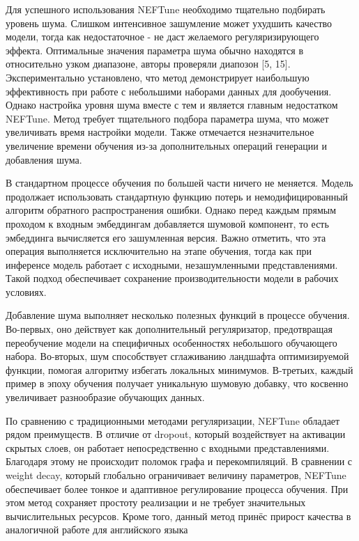 Для успешного использования NEFTune необходимо тщательно подбирать уровень шума.
Слишком интенсивное зашумление может ухудшить качество модели, тогда как недостаточное - не даст желаемого регуляризирующего эффекта.
Оптимальные значения параметра шума обычно находятся в относительно узком диапазоне, авторы проверяли диапозон [5, 15].
Экспериментально установлено, что метод демонстрирует наибольшую эффективность при работе с небольшими наборами данных для дообучения.
Однако настройка уровня шума вместе с тем и является главным недостатком NEFTune.
Метод требует тщательного подбора параметра шума, что может увеличивать время настройки модели.
Также отмечается незначительное увеличение времени обучения из-за дополнительных операций генерации и добавления шума.

В стандартном процессе обучения по большей части ничего не меняется.
Модель продолжает использовать стандартную функцию потерь и немодифицированный алгоритм обратного распространения ошибки.
Однако перед каждым прямым проходом к входным эмбеддингам добавляется шумовой компонент, то есть эмбеддинга вычисляется его зашумленная версия.
Важно отметить, что эта операция выполняется исключительно на этапе обучения, тогда как при инференсе модель работает с исходными, незашумленными представлениями.
Такой подход обеспечивает сохранение производительности модели в рабочих условиях.

Добавление шума выполняет несколько полезных функций в процессе обучения.
Во-первых, оно действует как дополнительный регуляризатор, предотвращая переобучение модели на специфичных особенностях небольшого обучающего набора.
Во-вторых, шум способствует сглаживанию ландшафта оптимизируемой функции, помогая алгоритму избегать локальных минимумов.
В-третьих, каждый пример в эпоху обучения получает уникальную шумовую добавку, что косвенно увеличивает разнообразие обучающих данных.

По сравнению с традиционными методами регуляризации, NEFTune обладает рядом преимуществ.
В отличие от dropout, который воздействует на активации скрытых слоев, он работает непосредственно с входными представлениями.
Благодаря этому не происходит поломок графа  и перекомпиляций.
В сравнении с weight decay, который глобально ограничивает величину параметров, NEFTune обеспечивает более тонкое и адаптивное регулирование процесса обучения.
При этом метод сохраняет простоту реализации и не требует значительных вычислительных ресурсов.
Кроме того, данный метод принёс прирост качества в аналогичной работе для английского языка

